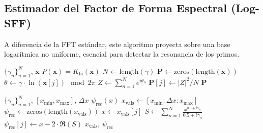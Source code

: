 \documentclass[12pt, a4paper]{article}
\theoremstyle{plain}
\theoremstyle{definition}
\begin{document}
\subsection{Estimador del Factor de Forma Espectral (Log-SFF)}

A diferencia de la FFT estándar, este algoritmo proyecta sobre una base logarítmica no uniforme, esencial para detectar la resonancia de los primos.


\begin{algorithm}
\caption{Cálculo del Factor de Forma Espectral Logarítmico}
\label{alg:logsff}
\begin{algorithmic}[1]
\Require $\{\gamma_n\}_{n=1}^N$, $\mathbf{x}$
\Ensure $P(\mathbf{x}) = K_{\ln}(\mathbf{x})$
    \State $N \gets \text{length}(\gamma)$
    \State $\mathbf{P} \gets \text{zeros}(\text{length}(\mathbf{x}))$
        \State $\theta \gets \gamma \cdot \ln(\mathbf{x}[j]) \mod 2\pi$
        \State $Z \gets \sum_{n=1}^N e^{i\theta_n}$
        \State $\mathbf{P}[j] \gets |Z|^2 / N$
    \EndFor
    \State \Return $\mathbf{P}$
\EndFunction
\end{algorithmic}
\end{algorithm}



\begin{algorithm}
\caption{Validación del Teorema de Reconstrucción}
\label{alg:validacion_reconstruccion}
\begin{algorithmic}[1]
\Require $\{\gamma_n\}_{n=1}^N$, $[x_{\min}, x_{\max}]$, $\Delta x$
\Ensure $\psi_{\text{rec}}(x)$
    \State $x_{\text{vals}} \gets [x_{\min}: \Delta x: x_{\max}]$
    \State $\psi_{\text{rec}} \gets \text{zeros}(\text{length}(x_{\text{vals}}))$
        \State $x \gets x_{\text{vals}}[j]$
        \State $S \gets \sum_{n=1}^N \frac{x^{0.5 + i\gamma_n}}{0.5 + i\gamma_n}$
        \State $\psi_{\text{rec}}[j] \gets x - 2 \cdot \Re(S)$
    \EndFor
    \State \Return $x_{\text{vals}}$, $\psi_{\text{rec}}$
\EndFunction
\end{algorithmic}
\end{algorithm}
\end{document}
